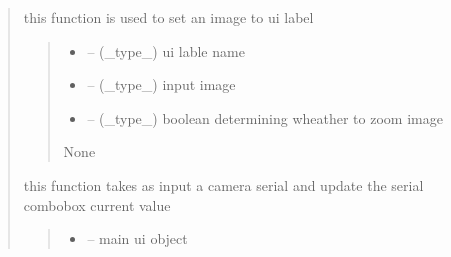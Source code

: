 \documentclass[letterpaper,10pt,english]{sphinxmanual}
\begin{document}
\begin{quote}
\begin{savenotes}\begin{fulllineitems}
\label{\detokenize{setting/backend/camera_funcs:oxin.backend.camera_funcs.set_camera_picture_to_ui}}
\pysigstartsignatures
{}
\pysigstopsignatures
\sphinxAtStartPar
this function is used to set an image to ui label
\begin{quote}\begin{description}
\begin{itemize}
\item {} 
\sphinxAtStartPar
{} – (\_type\_) ui lable name

\item {} 
\sphinxAtStartPar
{} – (\_type\_) input image

\item {} 
\sphinxAtStartPar
{} – (\_type\_) boolean determining wheather to zoom image

\end{itemize}

\sphinxAtStartPar
None

\end{description}\end{quote}

\end{fulllineitems}\end{savenotes}


\begin{savenotes}\begin{fulllineitems}
\label{\detokenize{setting/backend/camera_funcs:oxin.backend.camera_funcs.set_camera_serial_to_ui}}
\pysigstartsignatures
{}
\pysigstopsignatures
\sphinxAtStartPar
this function takes as input a camera serial and update the serial combobox current value
\begin{quote}\begin{description}
\begin{itemize}
\item {} 
\sphinxAtStartPar
{} – main ui object


\end{itemize}
\end{description}
\end{quote}
\end{fulllineitems}
\end{savenotes}
\end{quote}
\end{document}
